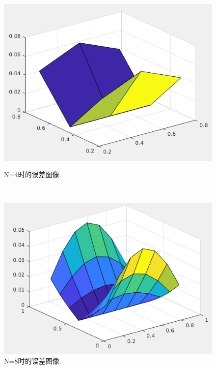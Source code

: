 \documentclass[12pt,a4paper]{article}
\begin{document}
\begin{figure}[ht]
	\begin{minipage}[t]{0.4\linewidth}%
		\centering     %
		\includegraphics[width=1.2\textwidth]{./figures/n4.png}
		\caption{N=4时的误差图像.}%
		\label{fig:liuchengtu1}%
	\end{minipage} 
	\hfill
	\begin{minipage}[t]{0.4\linewidth}
		\centering
		\includegraphics[width=1.2\textwidth]{./figures/n8.png}
		\caption{N=8时的误差图像.}%
		\label{fig:liuchengtu2}
	\end{minipage}
\end{figure}
\end{document}
